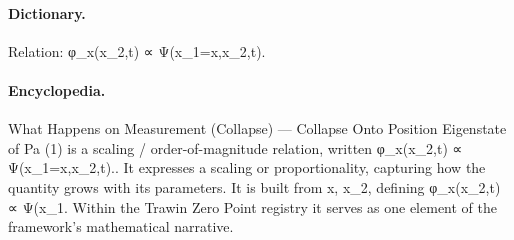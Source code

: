 \paragraph{Dictionary.}
Relation: φ\_x(x\_2,t) ∝ Ψ(x\_1=x,x\_2,t).

\paragraph{Encyclopedia.}
What Happens on Measurement (Collapse) — Collapse Onto Position Eigenstate of Pa (1) is a scaling / order-of-magnitude relation, written φ\_x(x\_2,t) ∝ Ψ(x\_1=x,x\_2,t).. It expresses a scaling or proportionality, capturing how the quantity grows with its parameters. It is built from x, x\_2, defining φ\_x(x\_2,t) ∝ Ψ(x\_1. Within the Trawin Zero Point registry it serves as one element of the framework's mathematical narrative.
